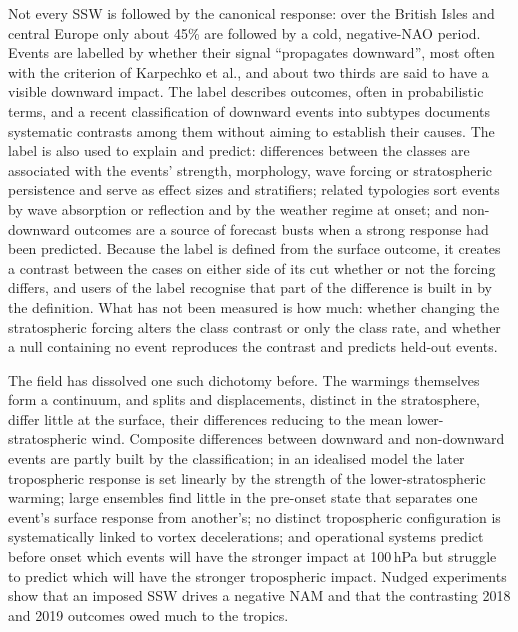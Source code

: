 \documentclass[11pt]{article}
\begin{document}
Not every SSW is followed by the canonical response: over the British Isles and central Europe only about 45\% are followed by a cold, negative-NAO period\cite{hall23}. Events are labelled by whether their signal ``propagates downward'', most often with the criterion of Karpechko et al.\cite{karpechko17}, and about two thirds are said to have a visible downward impact\cite{baldwin21,afargan24}. The label describes outcomes, often in probabilistic terms\cite{karpechko17}, and a recent classification of downward events into subtypes documents systematic contrasts among them without aiming to establish their causes\cite{lu26}. The label is also used to explain and predict: differences between the classes are associated with the events' strength, morphology, wave forcing or stratospheric persistence and serve as effect sizes and stratifiers\cite{runde16,rao20,lu26}; related typologies sort events by wave absorption or reflection\cite{kodera16} and by the weather regime at onset\cite{domeisen20}; and non-downward outcomes are a source of forecast busts when a strong response had been predicted\cite{nebel24}. Because the label is defined from the surface outcome, it creates a contrast between the cases on either side of its cut whether or not the forcing differs\cite{altman06}, and users of the label recognise that part of the difference is built in by the definition\cite{white19,lu26}. What has not been measured is how much: whether changing the stratospheric forcing alters the class contrast or only the class rate, and whether a null containing no event reproduces the contrast and predicts held-out events.

The field has dissolved one such dichotomy before. The warmings themselves form a continuum\cite{coughlin09,maury16}, and splits and displacements, distinct in the stratosphere, differ little at the surface, their differences reducing to the mean lower-stratospheric wind\cite{charlton07,maycock15}. Composite differences between downward and non-downward events are partly built by the classification\cite{white19}; in an idealised model the later tropospheric response is set linearly by the strength of the lower-stratospheric warming\cite{white20}; large ensembles find little in the pre-onset state that separates one event's surface response from another's\cite{bett23}; no distinct tropospheric configuration is systematically linked to vortex decelerations\cite{gallego26}; and operational systems predict before onset which events will have the stronger impact at 100\,hPa but struggle to predict which will have the stronger tropospheric impact\cite{nebel24}. Nudged experiments show that an imposed SSW drives a negative NAM\cite{hitchcock14,hong26} and that the contrasting 2018 and 2019 outcomes owed much to the tropics\cite{knight20}.
\end{document}

